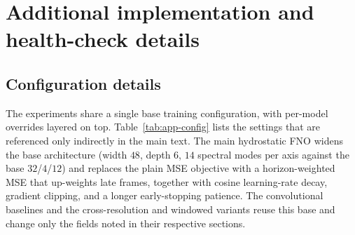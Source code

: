 \section{Additional implementation and health-check details}
\label{app:details}

\subsection{Configuration details}
\label{app:conf-details}

The experiments share a single base training configuration, with per-model overrides layered on top. Table~\ref{tab:app-config} lists the settings that are referenced only indirectly in the main text. The main hydrostatic FNO widens the base architecture (width $48$, depth $6$, $14$ spectral modes per axis against the base $32$/$4$/$12$) and replaces the plain MSE objective with a horizon-weighted MSE that up-weights late frames, together with cosine learning-rate decay, gradient clipping, and a longer early-stopping patience. The convolutional baselines and the cross-resolution and windowed variants reuse this base and change only the fields noted in their respective sections.

